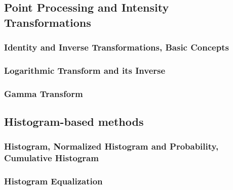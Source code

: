 \subsection{Point Processing and Intensity Transformations} 
\label{booksection_17_Point_Processing_and_Intensity_Transformations}
\subsubsection{Identity and Inverse Transformations, Basic Concepts} 
\label{booksection_18_Identity_and_Inverse_Transformations_Basic_Concepts}

\subsubsection{Logarithmic Transform and its Inverse} 
\label{booksection_19_Logarithmic_Transform_and_its_Inverse}

\subsubsection{Gamma Transform} 
\label{booksection_20_Gamma_Transform}

\subsection{Histogram-based methods} 
\label{booksection_21_Histogram-based_methods}
\subsubsection{Histogram, Normalized Histogram and Probability, Cumulative Histogram} 
\label{booksection_22_Histogram_Normalized_Histogram_and_Probability_Cumulative_Histogram}

\subsubsection{Histogram Equalization} 
\label{booksection_23_Histogram_Equalization}


